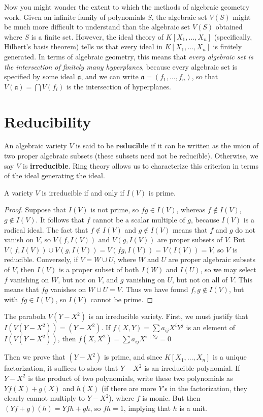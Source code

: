 Now you might wonder the extent to which the methods of algebraic geometry work. Given an infinite family of polynomials $S$, the algebraic set $V(S)$ might be much more difficult to understand than the algebraic set $V(S)$ obtained where $S$ is a finite set. However, the ideal theory of $K[X_1, \dots, X_n]$ (specifically, Hilbert's basis theorem) tells us that every ideal in $K[X_1, \dots, X_n]$ is finitely generated. In terms of algebraic geometry, this means that {\it every algebraic set is the intersection of finitely many hyperplanes}, because every algebraic set is specified by some ideal $\mathfrak{a}$, and we can write $\mathfrak{a} = (f_1,\dots,f_n)$, so that $V(\mathfrak{a}) = \bigcap V(f_i)$ is the intersection of hyperplanes.

\section{Reducibility}

An algebraic variety $V$ is said to be {\bf reducible} if it can be written as the union of two proper algebraic subsets (these subsets need not be reducible). Otherwise, we say $V$ is {\bf irreducible}. Ring theory allows us to characterize this criterion in terms of the ideal generating the ideal.

\begin{prop}
    A variety $V$ is irreducible if and only if $I(V)$ is prime.
\end{prop}
\begin{proof}
    Suppose that $I(V)$ is not prime, so $fg \in I(V)$, whereas $f \not \in I(V)$, $g \not \in I(V)$. It follows that $f$ cannot be a scalar multiple of $g$, because $I(V)$ is a radical ideal. The fact that $f \not \in I(V)$ and $g \not \in I(V)$ means that $f$ and $g$ do not vanish on $V$, so $V(f, I(V))$ and $V(g, I(V))$ are proper subsets of $V$. But $V(f, I(V)) \cup V(g, I(V)) = V(fg, I(V)) = V(I(V)) = V$, so $V$ is reducible. Conversely, if $V = W \cup U$, where $W$ and $U$ are proper algebraic subsets of $V$, then $I(V)$ is a proper subset of both $I(W)$ and $I(U)$, so we may select $f$ vanishing on $W$, but not on $V$, and $g$ vanishing on $U$, but not on all of $V$. This means that $fg$ vanishes on $W \cup U = V$. Thus we have found $f,g \not \in I(V)$, but with $fg \in I(V)$, so $I(V)$ cannot be prime.
\end{proof}

\begin{example}
    The parabola $V(Y - X^2)$ is an irreducible variety. First, we must justify that $I(V(Y - X^2)) = (Y - X^2)$. If $f(X,Y) = \sum a_{ij}X^iY^j$ is an element of $I(V(Y - X^2))$, then $f(X,X^2) = \sum a_{ij} X^{i + 2j} = 0$

    Then we prove that $(Y - X^2)$ is prime, and since $K[X_1, \dots, X_n]$ is a unique factorization, it suffices to show that $Y - X^2$ is an irreducible polynomial. If $Y - X^2$ is the product of two polynomials, write these two polynomials as $Yf(X) + g(X)$ and $h(X)$ (if there are more $Y$'s in the factorization, they clearly cannot multiply to $Y - X^2$), where $f$ is monic. But then $(Yf + g)(h) = Yfh + gh$, so $fh = 1$, implying that $h$ is a unit.
\end{example}

